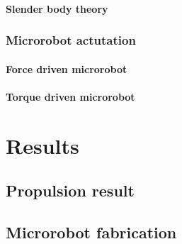 \documentclass[12pt,a4paper,titlepage]{report}
\begin{document}
\subsubsection{Slender body theory}\label{method1}


\subsection{Microrobot actutation}

\subsubsection{Force driven microrobot}

\subsubsection{Torque driven microrobot}

\chapter{Results}

\section{Propulsion result}

\section{Microrobot fabrication}
\end{document}
